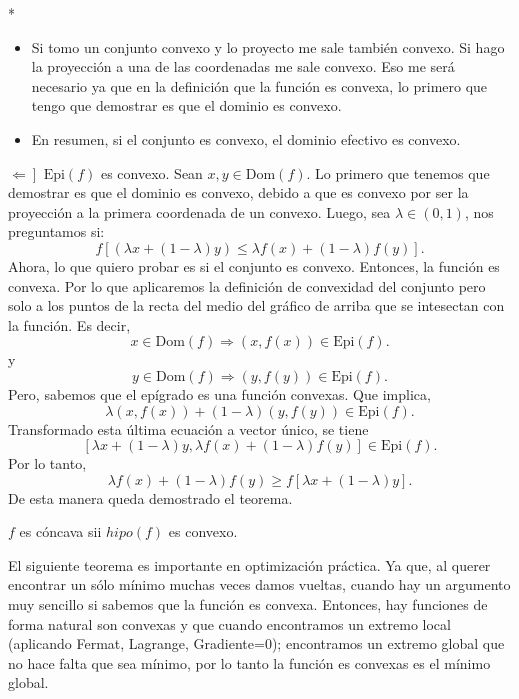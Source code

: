 \begin{paracol}{2}
\begin{teo}
    \switchcolumn[1]*{\noindent\scriptsize
	\begin{itemize}
	    \item Si tomo un conjunto convexo y lo proyecto me sale también convexo. Si hago la proyección a una de las coordenadas me sale convexo. Eso me será necesario ya que en la definición que la función es convexa, lo primero que tengo que demostrar es que el dominio es convexo. 
	    \item En resumen, si el conjunto es convexo, el dominio efectivo es convexo.
	\end{itemize}
	}
    \switchcolumn[0]\noindent
    $\left.\Leftarrow\right]$ $\text{Epi}(f)$ es convexo. Sean $x,y\in \text{Dom}(f)$. Lo primero que tenemos que demostrar es que el dominio es convexo, debido a que es convexo por ser la proyección a la primera coordenada de un convexo. Luego, sea $\lambda \in (0,1)$, nos preguntamos si:
    $$f\left[\left(\lambda x + (1-\lambda)y\right)\leq \lambda f(x) + (1-\lambda)f(y)\right].$$
    Ahora, lo que quiero probar es si el conjunto es convexo. Entonces, la función es convexa. Por lo que aplicaremos la definición de convexidad del conjunto pero solo a los puntos de la recta del medio del gráfico de arriba que se intesectan con la función. Es decir, 
    $$x\in \text{Dom}(f) \Rightarrow (x,f(x))\in \text{Epi}(f).$$
    y 
    $$y\in \text{Dom}(f) \Rightarrow (y,f(y))\in \text{Epi}(f).$$
    Pero, sabemos que el epígrado es una función convexas. Que implica,
    $$\lambda (x,f(x)) + (1-\lambda)(y,f(y))\in \text{Epi}(f).$$
    Transformado esta última ecuación a vector único, se tiene
    $$\left[\lambda x + (1-\lambda)y,\lambda f(x) + (1-\lambda)f(y)\right]\in \text{Epi}(f).$$
    Por lo tanto,
    $$\lambda f(x) + (1-\lambda)f(y)\geq f\left[\lambda x + (1-\lambda)y\right].$$
    De esta manera queda demostrado el teorema.
\end{teo}

\begin{teo} $f$ es cóncava sii $hipo(f)$ es convexo.

\end{teo}

\begin{tcolorbox}[colframe=white]
    El siguiente teorema es importante en optimización práctica. Ya que, al querer encontrar un sólo mínimo muchas veces damos vueltas, cuando hay un argumento muy sencillo si sabemos que la función es convexa. Entonces, hay funciones de forma natural son convexas y que cuando encontramos un extremo local (aplicando Fermat, Lagrange, Gradiente=0); encontramos un extremo global que no hace falta que sea mínimo, por lo tanto la función es convexas es el mínimo global. 
\end{tcolorbox}


\end{paracol}
